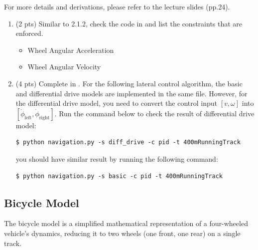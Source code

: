\documentclass[11pt]{article}
\begin{document}
For more details and derivations, please refer to the lecture slides (pp.24).
\begin{enumerate}
    \item \textbf{\faPen} (2 pts) Similar to 2.1.2, check the code in \textcolor{teal}{\texttt{\allowbreak{}}} and list the constraints that are enforced.
          \begin{itemize}
            \color{blue}
                \item Wheel Angular Acceleration
                \item Wheel Angular Velocity
          \end{itemize}
    \item \textbf{\faPython} (4 pts) Complete \textcolor{teal}{\texttt{}} in \textcolor{teal}{\texttt{}}.
          For the following lateral control algorithm, the basic and differential drive models are implemented in the same file. However, for the differential drive model, you need to convert the control input $[v, \omega]$ into $[\dot{\phi}_{\mathrm{left}}, \dot{\phi}_{\mathrm{right}}]$.
          Run the command below to check the result of differential drive model:
          \begin{lstlisting}
$ python navigation.py -s diff_drive -c pid -t 400mRunningTrack
          \end{lstlisting}

          you should have similar result by running the following command:
          \begin{lstlisting}
$ python navigation.py -s basic -c pid -t 400mRunningTrack
          \end{lstlisting}

\end{enumerate}



\subsection{Bicycle Model}
\noindent The bicycle model is a simplified mathematical representation of a four-wheeled vehicle’s dynamics, reducing it to two wheels (one front, one rear) on a single track. \\
\end{document}
